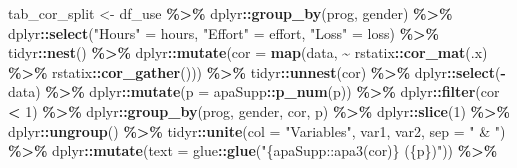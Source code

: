 \documentclass[
]{article}
\newenvironment{Shaded}{\begin{snugshade}}{\end{snugshade}}
\newcommand{\AttributeTok}[1]{\textcolor[rgb]{0.13,0.29,0.53}{#1}}
\newcommand{\DecValTok}[1]{\textcolor[rgb]{0.00,0.00,0.81}{#1}}
\newcommand{\FunctionTok}[1]{\textcolor[rgb]{0.13,0.29,0.53}{\textbf{#1}}}
\newcommand{\NormalTok}[1]{#1}
\newcommand{\OtherTok}[1]{\textcolor[rgb]{0.56,0.35,0.01}{#1}}
\newcommand{\SpecialCharTok}[1]{\textcolor[rgb]{0.81,0.36,0.00}{\textbf{#1}}}
\newcommand{\StringTok}[1]{\textcolor[rgb]{0.31,0.60,0.02}{#1}}
\begin{document}
\begin{Shaded}
\begin{Highlighting}[]
\NormalTok{tab\_cor\_split }\OtherTok{\textless{}{-}}\NormalTok{ df\_use }\SpecialCharTok{\%\textgreater{}\%} 
\NormalTok{  dplyr}\SpecialCharTok{::}\FunctionTok{group\_by}\NormalTok{(prog, gender) }\SpecialCharTok{\%\textgreater{}\%} 
\NormalTok{  dplyr}\SpecialCharTok{::}\FunctionTok{select}\NormalTok{(}\StringTok{"Hours"} \OtherTok{=}\NormalTok{ hours, }
                \StringTok{"Effort"} \OtherTok{=}\NormalTok{ effort, }
                \StringTok{"Loss"} \OtherTok{=}\NormalTok{ loss) }\SpecialCharTok{\%\textgreater{}\%} 
\NormalTok{  tidyr}\SpecialCharTok{::}\FunctionTok{nest}\NormalTok{() }\SpecialCharTok{\%\textgreater{}\%} 
\NormalTok{  dplyr}\SpecialCharTok{::}\FunctionTok{mutate}\NormalTok{(}\AttributeTok{cor =} \FunctionTok{map}\NormalTok{(data, }
                          \SpecialCharTok{\textasciitilde{}}\NormalTok{ rstatix}\SpecialCharTok{::}\FunctionTok{cor\_mat}\NormalTok{(.x) }\SpecialCharTok{\%\textgreater{}\%} 
\NormalTok{                            rstatix}\SpecialCharTok{::}\FunctionTok{cor\_gather}\NormalTok{())) }\SpecialCharTok{\%\textgreater{}\%} 
\NormalTok{  tidyr}\SpecialCharTok{::}\FunctionTok{unnest}\NormalTok{(cor) }\SpecialCharTok{\%\textgreater{}\%} 
\NormalTok{  dplyr}\SpecialCharTok{::}\FunctionTok{select}\NormalTok{(}\SpecialCharTok{{-}}\NormalTok{data) }\SpecialCharTok{\%\textgreater{}\%} 
\NormalTok{  dplyr}\SpecialCharTok{::}\FunctionTok{mutate}\NormalTok{(}\AttributeTok{p =}\NormalTok{ apaSupp}\SpecialCharTok{::}\FunctionTok{p\_num}\NormalTok{(p)) }\SpecialCharTok{\%\textgreater{}\%} 
\NormalTok{  dplyr}\SpecialCharTok{::}\FunctionTok{filter}\NormalTok{(cor }\SpecialCharTok{\textless{}} \DecValTok{1}\NormalTok{) }\SpecialCharTok{\%\textgreater{}\%} 
\NormalTok{  dplyr}\SpecialCharTok{::}\FunctionTok{group\_by}\NormalTok{(prog, gender, cor, p) }\SpecialCharTok{\%\textgreater{}\%} 
\NormalTok{  dplyr}\SpecialCharTok{::}\FunctionTok{slice}\NormalTok{(}\DecValTok{1}\NormalTok{) }\SpecialCharTok{\%\textgreater{}\%} 
\NormalTok{  dplyr}\SpecialCharTok{::}\FunctionTok{ungroup}\NormalTok{() }\SpecialCharTok{\%\textgreater{}\%} 
\NormalTok{  tidyr}\SpecialCharTok{::}\FunctionTok{unite}\NormalTok{(}\AttributeTok{col =} \StringTok{"Variables"}\NormalTok{, var1, var2, }\AttributeTok{sep =} \StringTok{" \& "}\NormalTok{) }\SpecialCharTok{\%\textgreater{}\%} 
\NormalTok{  dplyr}\SpecialCharTok{::}\FunctionTok{mutate}\NormalTok{(}\AttributeTok{text =}\NormalTok{ glue}\SpecialCharTok{::}\FunctionTok{glue}\NormalTok{(}\StringTok{"\{apaSupp::apa3(cor)\} (\{p\})"}\NormalTok{)) }\SpecialCharTok{\%\textgreater{}\%} 

\end{Highlighting}
\end{Shaded}
\end{document}
